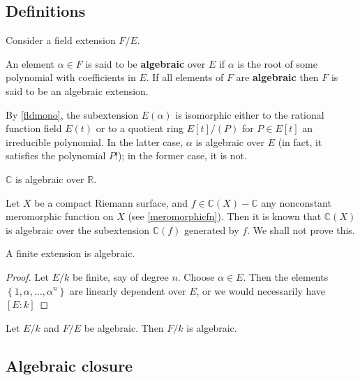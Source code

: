 \subsection{Definitions}

Consider a field extension $F/E$.

\begin{definition}
An element $\alpha\in F$ is said to be \textbf{algebraic} over $E$ if
$\alpha$ is the root of some polynomial with coefficients in $E$. If all
elements of $F$ are \textbf{algebraic} then $F$ is said to be an algebraic extension. 
\end{definition}

By \cref{fldmono}, the subextension $E(\alpha)$ is isomorphic either to
the rational function field $E(t)$ or to a quotient ring $E[t]/(P)$ for $P
\in E[t]$ an irreducible polynomial. 
In the latter case, $\alpha$ is algebraic over $E$ (in fact, it
satisfies the polynomial $P$!); in the former case, it is not.

\begin{example} 
$\mathbb{C}$ is algebraic over $\mathbb{R}$.
\end{example} 

\begin{example} 
Let $X$ be a compact Riemann surface, and $f \in \mathbb{C}(X) - \mathbb{C}$ any
nonconstant meromorphic function on $X$ (see \cref{meromorphicfn}). Then it is known that
$\mathbb{C}(X)$ is algebraic over the subextension $\mathbb{C}(f)$ generated by
$f$. We shall not prove this.
\end{example} 


\begin{proposition} 
A finite extension is algebraic. 
\end{proposition} 
\begin{proof} 
Let $E/k$ be finite, say of degree $n$. Choose $\alpha \in E$.
Then the elements 
$\left\{1, \alpha, \dots, \alpha^n\right\}$ are linearly
dependent over $E$, or we would necessarily have $[E:k]$

\end{proof} 

\begin{proposition} 
Let $E/k$ and $F/E$ be algebraic. Then $F/k$ is algebraic.
\end{proposition} 

\subsection{Algebraic closure}

